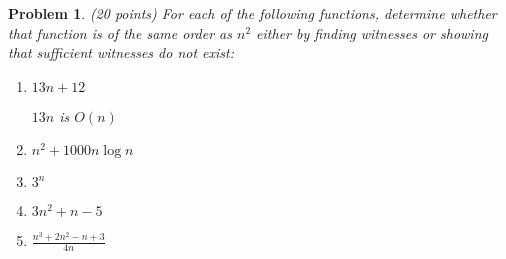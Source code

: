 \documentclass{article}
\newtheorem{problem}[theorem]{Problem}
\begin{document}
\begin{problem}
(20 points)\newline
For each of the following functions, determine whether that function is of
the same order as $n^2$ either by finding witnesses or showing that
sufficient witnesses do not exist:

\begin{enumerate}
\item $13n+12$

$13n$ is $O(n)$

\item $n^{2}+1000n\log {n}$

\item $3^{n}$

\item $3n^{2}+n-5$

\item $\displaystyle\frac{n^{3}+2n^{2}-n+3}{4n}$
\end{enumerate}
\end{problem}
\end{document}
